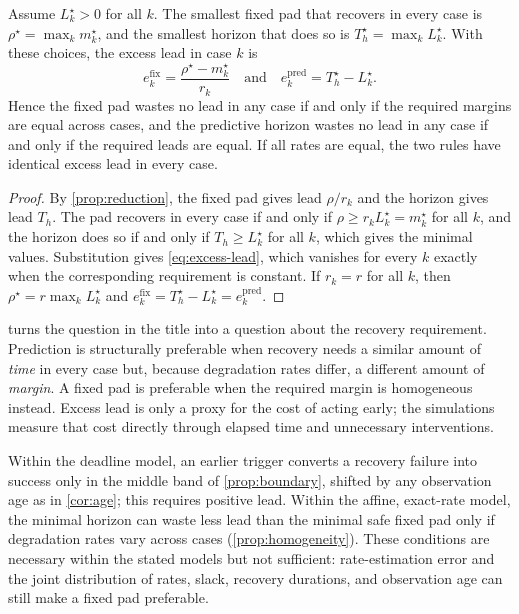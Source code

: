 \begin{proposition}
\label{prop:homogeneity}
Assume $L_k^\star>0$ for all $k$.  The smallest fixed pad that recovers in every
case is $\rho^\star=\max_k m_k^\star$, and the smallest horizon that does so is
$T_h^\star=\max_k L_k^\star$.  With these choices, the excess lead in case $k$ is
\begin{equation}
  e_k^{\mathrm{fix}}=\frac{\rho^\star-m_k^\star}{r_k}
  \quad\text{and}\quad
  e_k^{\mathrm{pred}}=T_h^\star-L_k^\star.
  \label{eq:excess-lead}
\end{equation}
Hence the fixed pad wastes no lead in any case if and only if the required
margins are equal across cases, and the predictive horizon wastes no lead in any
case if and only if the required leads are equal.  If all rates are equal, the
two rules have identical excess lead in every case.
\end{proposition}

\begin{proof}
By \cref{prop:reduction}, the fixed pad gives lead $\rho/r_k$ and the horizon
gives lead $T_h$.  The pad recovers in every case if and only if $\rho\ge
r_kL_k^\star=m_k^\star$ for all $k$, and the horizon does so if and only if
$T_h\ge L_k^\star$ for all $k$, which gives the minimal values.  Substitution
gives \eqref{eq:excess-lead}, which vanishes for every $k$ exactly when the
corresponding requirement is constant.  If $r_k=r$ for all $k$, then
$\rho^\star=r\max_k L_k^\star$ and $e_k^{\mathrm{fix}}=T_h^\star-L_k^\star=
e_k^{\mathrm{pred}}$.
\end{proof}

 turns the question in the title into a question about
the recovery requirement.  Prediction is structurally preferable when recovery
needs a similar amount of \emph{time} in every case but, because degradation
rates differ, a different amount of \emph{margin}.  A fixed pad is preferable
when the required margin is homogeneous instead.  Excess lead is only a proxy
for the cost of acting early; the simulations measure that cost directly
through elapsed time and unnecessary interventions.

\begin{corollary}
\label{cor:necessary}
Within the deadline model, an earlier trigger converts a recovery failure into
success only in the middle band of \cref{prop:boundary}, shifted by any
observation age as in \cref{cor:age}; this requires positive lead.  Within the
affine, exact-rate model, the minimal horizon can waste less lead than the
minimal safe fixed pad only if degradation rates vary across cases
(\cref{prop:homogeneity}).  These conditions are necessary within the stated
models but not sufficient: rate-estimation error and the joint distribution of
rates, slack, recovery durations, and observation age can still make a fixed pad
preferable.
\end{corollary}
